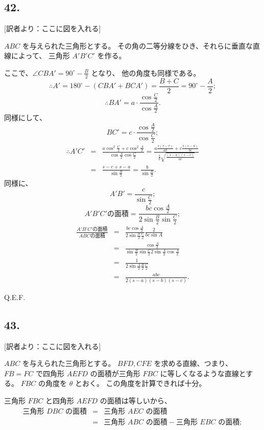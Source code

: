 \subsection*{42.}

[訳者より：ここに図を入れる]

$ABC$ を与えられた三角形とする。
その角の二等分線をひき、それらに垂直な直線によって、
三角形 $A'B'C'$ を作る。

ここで、$\angle CBA' = 90^\circ - \frac{B}{2}$ となり、
他の角度も同様である。
\[
\therefore
A' = 180^\circ - (CBA' + BCA') = \frac{B+C}{2} = 90^\circ - \frac{A}{2};
\]
\[
\therefore
BA' = a \cdot \frac{\cos \frac{C}{2}}{\cos \frac{A}{2}}.
\]
同様にして、
\[
BC' = c \cdot \frac{\cos \frac{A}{2}}{\cos \frac{C}{2}};
\]
\begin{eqnarray*}
\therefore
A'C' &=& \frac{a \cos^2 \frac{C}{2} + c \cos^2 \frac{A}{2}}{\cos \frac{A}{2} \cos \frac{C}{2}}
= \frac{a \frac{s(s-c)}{ab} + c \frac{s(s-a)}{bc}}{\frac{s}{b} \sqrt{\frac{(s-a)(s-c)}{ac}}}\\
&=& \frac{s -c + s -a}{\sin \frac{B}{2}}
= \frac{b}{\sin \frac{B}{2}}.
\end{eqnarray*}
同様に、
\[
A'B' = \frac{c}{\sin \frac{C}{2}};
\]
\[
A'B'C' \mbox{の面積} = 
\frac{bc \cos \frac{A}{2}}{2 \sin \frac{B}{2} \sin \frac{C}{2}};
\]
\begin{eqnarray*}
\frac{A'B'C' \mbox{の面積}}{ABC \mbox{の面積}}
&=&
 \frac{bc \cos \frac{A}{2}}{2 \sin \frac{B}{2} \frac{C}{2}}
  \frac{2}{bc \sin A}\\
&=&
 \frac{\cos \frac{A}{2}}{\sin \frac{B}{2} \sin \frac{C}{2} 2 \sin \frac{A}{2} \cos \frac{A}{2}}\\
&=&
 \frac{1}{2 \sin \frac{A}{2} \frac{B}{2} \frac{C}{2}}\\
&=&
\frac{abc}{2(s - a)(s - b)(s - c)}.
\end{eqnarray*}

Q.E.F.


\subsection*{43.}

[訳者より：ここに図を入れる] 

$ABC$ を与えられた三角形とする。
$BFD, CFE$ を求める直線、つまり、
$FB=FC$ で四角形 $AEFD$ の面積が三角形 $FBC$
に等しくなるような直線とする。
$FBC$ の角度を $\theta$  とおく。
この角度を計算できれば十分。

三角形 $FBC$ と四角形 $AEFD$ の面積は等しいから、
\begin{eqnarray*}
\mbox{三角形 $DBC$ の面積}
&=& 
\mbox{三角形 $AEC$ の面積}\\
&=&
\mbox{三角形 $ABC$ の面積} - \mbox{三角形 $EBC$ の面積};
\end{eqnarray*}

